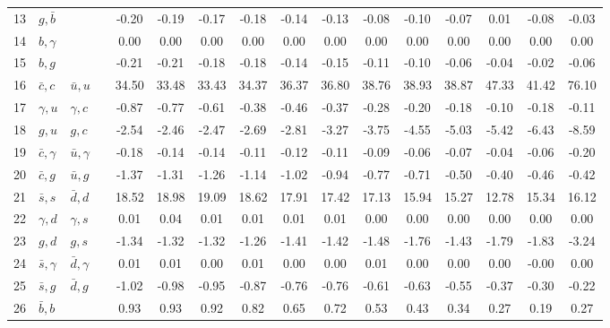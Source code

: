 \begin{tabularx}{\textwidth}{rXXX@{}S@{}S@{}S@{}S@{}S@{}S@{}S@{}S@{}S@{}S@{}S@{}S}
 13 & $g,\bar b$       &                  &                 & -0.20 & -0.19 & -0.17 & -0.18 & -0.14 & -0.13 & -0.08 & -0.10 & -0.07 &  0.01 & -0.08 & -0.03 \\
 14 & $b,\gamma$       &                  &                 &  0.00 &  0.00 &  0.00 &  0.00 &  0.00 &  0.00 &  0.00 &  0.00 &  0.00 &  0.00 &  0.00 &  0.00 \\
 15 & $b,g$            &                  &                 & -0.21 & -0.21 & -0.18 & -0.18 & -0.14 & -0.15 & -0.11 & -0.10 & -0.06 & -0.04 & -0.02 & -0.06 \\
 16 & $\bar c,c$       & $\bar u,u$       &                 & 34.50 & 33.48 & 33.43 & 34.37 & 36.37 & 36.80 & 38.76 & 38.93 & 38.87 & 47.33 & 41.42 & 76.10 \\
 17 & $\gamma, u$      & $\gamma, c$      &                 & -0.87 & -0.77 & -0.61 & -0.38 & -0.46 & -0.37 & -0.28 & -0.20 & -0.18 & -0.10 & -0.18 & -0.11 \\
 18 & $g,u$            & $g,c$            &                 & -2.54 & -2.46 & -2.47 & -2.69 & -2.81 & -3.27 & -3.75 & -4.55 & -5.03 & -5.42 & -6.43 & -8.59 \\
 19 & $\bar c,\gamma$  & $\bar u,\gamma$  &                 & -0.18 & -0.14 & -0.14 & -0.11 & -0.12 & -0.11 & -0.09 & -0.06 & -0.07 & -0.04 & -0.06 & -0.20 \\
 20 & $\bar c, g$      & $\bar u, g$      &                 & -1.37 & -1.31 & -1.26 & -1.14 & -1.02 & -0.94 & -0.77 & -0.71 & -0.50 & -0.40 & -0.46 & -0.42 \\
 21 & $\bar s, s$      & $\bar d, d$      &                 & 18.52 & 18.98 & 19.09 & 18.62 & 17.91 & 17.42 & 17.13 & 15.94 & 15.27 & 12.78 & 15.34 & 16.12 \\
 22 & $\gamma, d$      & $\gamma, s$      &                 &  0.01 &  0.04 &  0.01 &  0.01 &  0.01 &  0.01 &  0.00 &  0.00 &  0.00 &  0.00 &  0.00 &  0.00 \\
 23 & $g,d$            & $g,s$            &                 & -1.34 & -1.32 & -1.32 & -1.26 & -1.41 & -1.42 & -1.48 & -1.76 & -1.43 & -1.79 & -1.83 & -3.24 \\
 24 & $\bar s,\gamma$  & $\bar d,\gamma$  &                 &  0.01 &  0.01 &  0.00 &  0.01 &  0.00 &  0.00 &  0.01 &  0.00 &  0.00 &  0.00 & -0.00 &  0.00 \\
 25 & $\bar s,g$       & $\bar d, g$      &                 & -1.02 & -0.98 & -0.95 & -0.87 & -0.76 & -0.76 & -0.61 & -0.63 & -0.55 & -0.37 & -0.30 & -0.22 \\
 26 & $\bar b,b$       &                  &                 &  0.93 &  0.93 &  0.92 &  0.82 &  0.65 &  0.72 &  0.53 &  0.43 &  0.34 &  0.27 &  0.19 &  0.27 \\

\end{tabularx}
